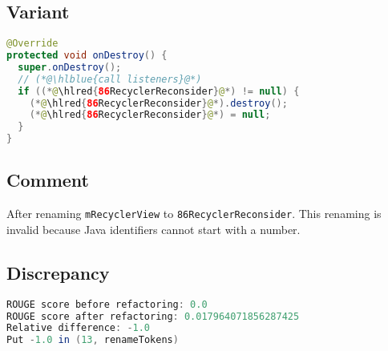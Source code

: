 \documentclass[11pt]{article}
\DeclareRobustCommand{\hlred}[1]{{\sethlcolor{YellowOrange}\hl{#1}}}
\DeclareRobustCommand{\hlblue}[1]{{\sethlcolor{SeaGreen}\hl{#1}}}
\DeclareRobustCommand{\hlblue}[1]{{\sethlcolor{SkyBlue}\hl{#1}}}
\begin{document}
\subsection{Variant}

\begin{lstlisting}[language=java]
@Override
protected void onDestroy() {
  super.onDestroy();
  // (*@\hlblue{call listeners}@*)
  if ((*@\hlred{86RecyclerReconsider}@*) != null) {
    (*@\hlred{86RecyclerReconsider}@*).destroy();
    (*@\hlred{86RecyclerReconsider}@*) = null;
  }
}
\end{lstlisting}
\subsection{Comment}

After renaming \texttt{mRecyclerView} to \texttt{86RecyclerReconsider}. This renaming is invalid because Java identifiers cannot start with a number.

\subsection{Discrepancy}

\begin{lstlisting}[language=java]
ROUGE score before refactoring: 0.0
ROUGE score after refactoring: 0.017964071856287425
Relative difference: -1.0
Put -1.0 in (13, renameTokens)
\end{lstlisting}
\end{document}
